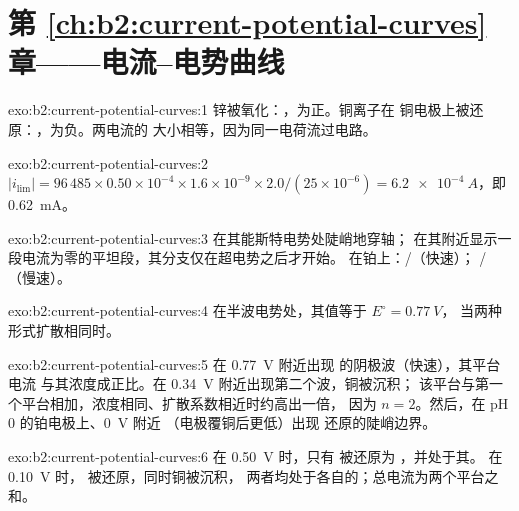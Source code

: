 \section*{第 \ref{ch:b2:current-potential-curves} 章——电流–电势曲线}

\begin{solution}{exo:b2:current-potential-curves:1}
锌被氧化：，为正。铜离子在
铜电极上被还原：，为负。两电流的
大小相等，因为同一电荷流过电路。
\end{solution}

\begin{solution}{exo:b2:current-potential-curves:2}
$|i_{\lim}| = 96\,485 \times 0.50 \times 10^{-4} \times 1.6 \times 10^{-9} \times
2.0/(25 \times 10^{-6}) = \qty{6.2e-4}{A}$，即 \qty{0.62}{mA}。
\end{solution}

\begin{solution}{exo:b2:current-potential-curves:3}
在其能斯特电势处陡峭地穿轴；
在其附近显示一段电流为零的平坦段，其分支仅在超电势之后才开始。
在铂上：/（快速）；
/（慢速）。
\end{solution}

\begin{solution}{exo:b2:current-potential-curves:4}
在半波电势处，其值等于 $E^\circ = \qty{0.77}{V}$，
当两种形式扩散相同时。
\end{solution}

\begin{solution}{exo:b2:current-potential-curves:5}
在 \qty{0.77}{V} 附近出现  的阴极波（快速），其平台电流
与其浓度成正比。在 \qty{0.34}{V} 附近出现第二个波，铜被沉积；
该平台与第一个平台相加，浓度相同、扩散系数相近时约高出一倍，
因为 $n = 2$。然后，在 pH 0 的铂电极上、\qty{0}{V} 附近
（电极覆铜后更低）出现
 还原的陡峭边界。
\end{solution}

\begin{solution}{exo:b2:current-potential-curves:6}
在 \qty{0.50}{V} 时，只有  被还原为 ，并处于其。
在 \qty{0.10}{V} 时， 被还原，同时铜被沉积，
两者均处于各自的；总电流为两个平台之和。
\end{solution}

